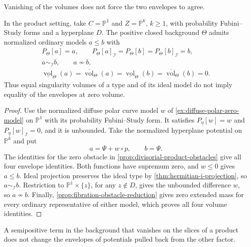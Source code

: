 Vanishing of the volumes does not force the two envelopes to agree.

\begin{example}\label{ex:zero-volume-distinct-product-models}
In the product setting, take $C=\mathbb P^1$ and $Z=\mathbb P^k$, $k\geq1$, with probability Fubini--Study forms and a hyperplane $D$. The positive closed background $\Theta$ admits normalized ordinary models $a\leq b$ with
\[
 \begin{gathered}
 P_\Theta[a]=a,\qquad
 P_\Theta[a]_{\mathcal I}=P_\Theta[b]=P_\Theta[b]_{\mathcal I}=b,\\
 a\sim_{\mathcal I}b,\qquad a\not\sim b,\\
 \underline{\operatorname{vol}}_\Theta(a)
 =\overline{\operatorname{vol}}_\Theta(a)
 =\underline{\operatorname{vol}}_\Theta(b)
 =\overline{\operatorname{vol}}_\Theta(b)=0.
 \end{gathered}
\]
Thus equal singularity volumes of a type and of its ideal model do not imply equality of the envelopes at zero volume.
\end{example}
\begin{proof}
Use the normalized diffuse polar curve model $w$ of \cref{ex:diffuse-polar-zero-model} on $\mathbb P^1$ with its probability Fubini--Study form. It satisfies $P_\eta[w]=w$ and $P_\eta[w]_{\mathcal I}=0$, and it is unbounded. Take the normalized hyperplane potential on $\mathbb P^k$ and put
\[
 a=\Psi+w\circ p,\qquad b=\Psi.
\]
The identities for the zero obstacle in \cref{prop:divisorial-product-obstacles} give all four envelope identities. Both functions have supremum zero, and $w\leq0$ gives $a\leq b$. Ideal projection preserves the ideal type by \cref{thm:hermitian-i-projection}, so $a\sim_{\mathcal I}b$. Restriction to $\mathbb P^1\times\{z\}$, for any $z\notin D$, gives the unbounded difference $w$, so $a\not\sim b$. Finally, \cref{prop:fibration-obstacle-reduction} gives zero extended mass for every ordinary representative of either model, which proves all four volume identities.
\end{proof}

A semipositive term in the background that vanishes on the slices of a product does not change the envelopes of potentials pulled back from the other factor.

